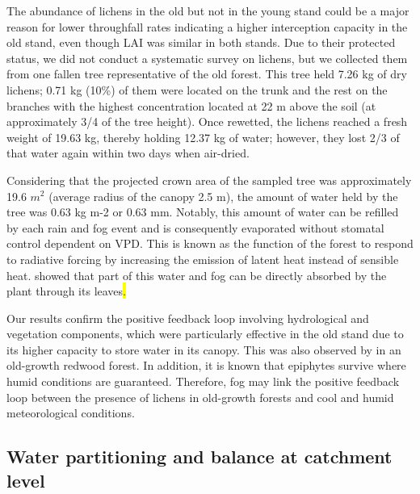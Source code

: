 \documentclass[10pt,letterpaper]{article}
\begin{document}
The abundance of lichens in the old but not in the young stand could be a major reason for lower throughfall rates indicating a higher interception capacity in the old stand, even though LAI was similar in both stands. Due to their protected status, we did not conduct a systematic survey on lichens, but we collected them from one fallen tree representative of the old forest. This tree held 7.26 kg of dry lichens; 0.71 kg (10\%) of them were located on the trunk and the rest on the branches with the highest concentration located at 22 m above the soil (at approximately 3/4 of the tree height). Once rewetted, the lichens reached a fresh weight of 19.63 kg, thereby holding 12.37 kg of water; however, they lost 2/3 of that water again within two days when air-dried. 

Considering that the projected crown area of the sampled tree was approximately 19.6 $m^2$ (average radius of the canopy 2.5 m), the amount of water held by the tree was 0.63 kg m-2 or 0.63 mm. Notably, this amount of water can be refilled by each rain and fog event and is consequently evaporated without stomatal control dependent on VPD. This is known as the function of the forest to respond to radiative forcing by increasing the emission of latent heat instead of sensible heat. \cite{Burgess} showed that part of this water and fog can be directly absorbed by the plant through its leaves\hl{.} 

Our results confirm the positive feedback loop involving hydrological and vegetation components, which were particularly effective in the old stand due to its higher capacity to store water in its canopy. This was also observed by \cite{Sillett} in an old-growth redwood forest. In addition, it is known that epiphytes survive where humid conditions are guaranteed. Therefore, fog may link the positive feedback loop between the presence of lichens in old-growth forests and cool and humid meteorological conditions. 

\subsection{Water partitioning and balance at catchment level}
\end{document}
